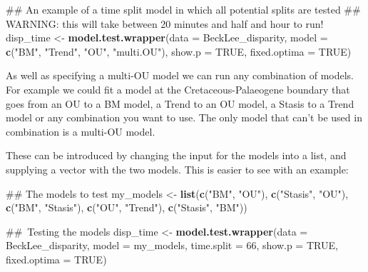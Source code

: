\documentclass[]{book}
\newenvironment{Shaded}{\begin{snugshade}}{\end{snugshade}}
\newcommand{\KeywordTok}[1]{\textcolor[rgb]{0.13,0.29,0.53}{\textbf{#1}}}
\newcommand{\DataTypeTok}[1]{\textcolor[rgb]{0.13,0.29,0.53}{#1}}
\newcommand{\DecValTok}[1]{\textcolor[rgb]{0.00,0.00,0.81}{#1}}
\newcommand{\StringTok}[1]{\textcolor[rgb]{0.31,0.60,0.02}{#1}}
\newcommand{\OtherTok}[1]{\textcolor[rgb]{0.56,0.35,0.01}{#1}}
\newcommand{\AlertTok}[1]{\textcolor[rgb]{0.94,0.16,0.16}{#1}}
\newcommand{\NormalTok}[1]{#1}
\theoremstyle{definition}
\theoremstyle{definition}
\theoremstyle{definition}
\theoremstyle{remark}
\begin{document}
\begin{Shaded}
\begin{Highlighting}[]
\NormalTok{## An example of a time split model in which all potential splits are tested}
\NormalTok{## }\AlertTok{WARNING}\NormalTok{: this will take between 20 minutes and half and hour to run!}
\NormalTok{disp_time <-}\StringTok{ }\KeywordTok{model.test.wrapper}\NormalTok{(}\DataTypeTok{data =}\NormalTok{ BeckLee_disparity, }\DataTypeTok{model =} \KeywordTok{c}\NormalTok{(}\StringTok{"BM"}\NormalTok{, }\StringTok{"Trend"}\NormalTok{, }\StringTok{"OU"}\NormalTok{, }\StringTok{"multi.OU"}\NormalTok{),}
                                \DataTypeTok{show.p =} \OtherTok{TRUE}\NormalTok{, }\DataTypeTok{fixed.optima =} \OtherTok{TRUE}\NormalTok{)}
\end{Highlighting}
\end{Shaded}

As well as specifying a multi-OU model we can run any combination of
models. For example we could fit a model at the Cretaceous-Palaeogene
boundary that goes from an OU to a BM model, a Trend to an OU model, a
Stasis to a Trend model or any combination you want to use. The only
model that can't be used in combination is a multi-OU model.

These can be introduced by changing the input for the models into a
list, and supplying a vector with the two models. This is easier to see
with an example:

\begin{Shaded}
\begin{Highlighting}[]
\NormalTok{## The models to test}
\NormalTok{my_models <-}\StringTok{ }\KeywordTok{list}\NormalTok{(}\KeywordTok{c}\NormalTok{(}\StringTok{"BM"}\NormalTok{, }\StringTok{"OU"}\NormalTok{),}
                  \KeywordTok{c}\NormalTok{(}\StringTok{"Stasis"}\NormalTok{, }\StringTok{"OU"}\NormalTok{),}
                  \KeywordTok{c}\NormalTok{(}\StringTok{"BM"}\NormalTok{, }\StringTok{"Stasis"}\NormalTok{),}
                  \KeywordTok{c}\NormalTok{(}\StringTok{"OU"}\NormalTok{, }\StringTok{"Trend"}\NormalTok{),}
                  \KeywordTok{c}\NormalTok{(}\StringTok{"Stasis"}\NormalTok{, }\StringTok{"BM"}\NormalTok{))}

\NormalTok{## Testing the models}
\NormalTok{disp_time <-}\StringTok{ }\KeywordTok{model.test.wrapper}\NormalTok{(}\DataTypeTok{data =}\NormalTok{ BeckLee_disparity, }\DataTypeTok{model =}\NormalTok{ my_models, }\DataTypeTok{time.split =} \DecValTok{66}\NormalTok{,}
                                \DataTypeTok{show.p =} \OtherTok{TRUE}\NormalTok{, }\DataTypeTok{fixed.optima =} \OtherTok{TRUE}\NormalTok{)}
\end{Highlighting}
\end{Shaded}
\end{document}
